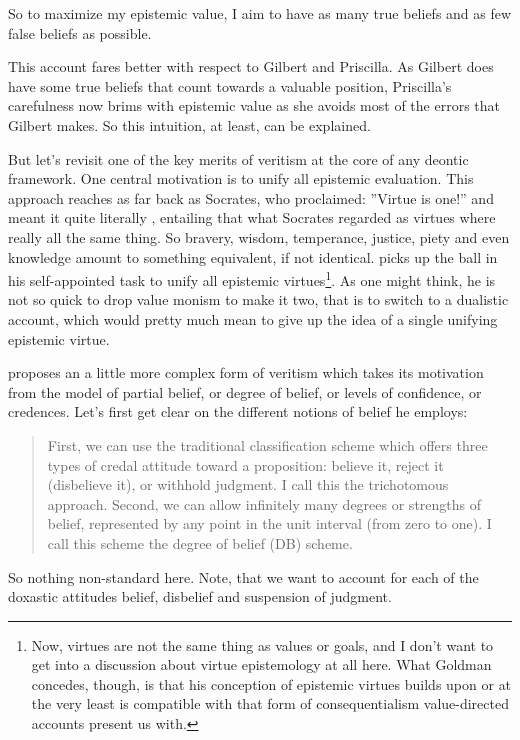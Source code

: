\documentclass[12pt,numbers=noenddot]{scrartcl}
\begin{document}
So to maximize my epistemic value, I aim to have as many true beliefs and as few false beliefs as possible.

This account fares better with respect to Gilbert and Priscilla. As Gilbert does have some true beliefs that count towards a valuable position, Priscilla’s carefulness now brims with epistemic value as she avoids most of the errors that Gilbert makes. So this intuition, at least, can be explained.

But let's revisit one of the key merits of veritism at the core of any deontic framework. One central motivation is to unify all epistemic evaluation. This approach reaches as far back as Socrates, who proclaimed: ”Virtue is one!” and meant it quite literally \textcite{penner1973}, entailing that what Socrates regarded as virtues where really all the same thing. So bravery, wisdom, temperance, justice, piety and even knowledge amount to something equivalent, if not identical.
\textcite{Goldman2002-GOLTUO-2} picks up the ball in his self-appointed task to unify all epistemic virtues\footnote{Now, virtues are not the same thing as values or goals, and I don't want to get into a discussion about virtue epistemology at all here. What Goldman concedes, though, is that his conception of epistemic virtues builds upon or at the very least is compatible with that form of consequentialism value-directed accounts present us with.}. As one might think, he is not so quick to drop value monism to make it two, that is to switch to a dualistic account, which would pretty much mean to give up the idea of a single unifying epistemic virtue.

\textcite[58]{Goldman2002-GOLTUO-2} proposes an a little more complex form of veritism which takes its motivation from the model of partial belief, or degree of belief, or levels of confidence, or credences. Let's first get clear on the different notions of belief he employs:

\begin{quote}
    First, we can use the traditional classification scheme which offers three types of credal attitude toward a proposition: believe it, reject it (disbelieve it), or withhold judgment. I call this the trichotomous approach. Second, we can allow infinitely many degrees or strengths of belief, represented by any point in the unit interval (from zero to one). I call this scheme the degree of belief (DB) scheme. \textcite[88]{Goldman1999-GOLKIA}
\end{quote}

So nothing non-standard here. Note, that we want to account for each of the doxastic attitudes belief, disbelief and suspension of judgment.
\end{document}
